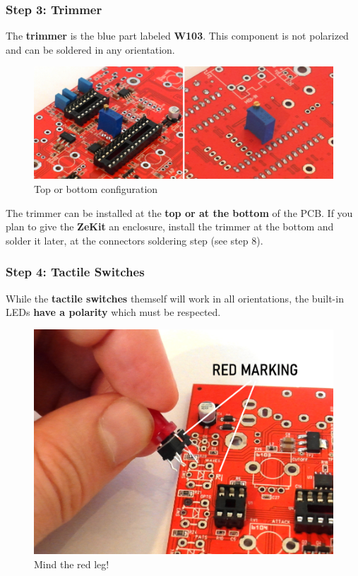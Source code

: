 \documentclass{scrartcl}
\begin{document}
\subsubsection{Step 3: Trimmer}

The \textbf{trimmer} is the blue part labeled \textbf{W103}. This component is not polarized and can be soldered in any orientation.

\begin{figure}[!ht]
    \begin{center}
        \includegraphics[scale=0.35]{assets/pcb-trimmer.jpg}
        \caption{Top or bottom configuration}
    \end{center}
\end{figure}

The trimmer can be installed at the \textbf{top or at the bottom} of the PCB. If you plan to give the \textbf{ZeKit} an enclosure, install the trimmer at the bottom and solder it later, at the connectors soldering step (see step 8).

\subsubsection{Step 4: Tactile Switches}

While the \textbf{tactile switches} themself will work in all orientations, the built-in LEDs \textbf{have a polarity} which must be respected.

\begin{figure}[!ht]
    \begin{center}
        \includegraphics[scale=0.30]{assets/tact-marking.jpg}
        \caption{Mind the red leg!}
    \end{center}
\end{figure}
\end{document}
